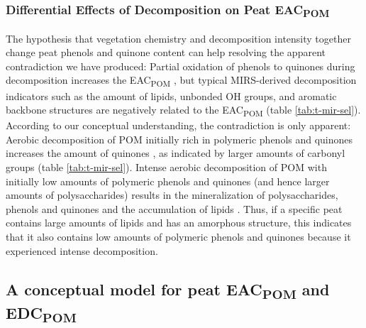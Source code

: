 \documentclass[alpha-refs, lineno]{wiley-article-rmd}
\begin{document}
\hypertarget{differential-effects-of-decomposition-on-peat-eac}{%
\subsubsection{\texorpdfstring{Differential Effects of Decomposition on Peat EAC\textsubscript{POM}}{Differential Effects of Decomposition on Peat EAC}}\label{differential-effects-of-decomposition-on-peat-eac}}

The hypothesis that vegetation chemistry and decomposition intensity together change peat phenols and quinone content can help resolving the apparent contradiction we have produced: Partial oxidation of phenols to quinones during decomposition increases the EAC\textsubscript{POM} \autocite{Aeschbacher.2012,Walpen.2018,Tan.2017}, but typical MIRS-derived decomposition indicators such as the amount of lipids, unbonded OH groups, and aromatic backbone structures \autocite{Cocozza.2003,Artz.2008} are negatively related to the EAC\textsubscript{POM} (table \ref{tab:t-mir-sel}). According to our conceptual understanding, the contradiction is only apparent: Aerobic decomposition of POM initially rich in polymeric phenols and quinones increases the amount of quinones \autocite{Aeschbacher.2012}, as indicated by larger amounts of carbonyl groups (table \ref{tab:t-mir-sel}). Intense aerobic decomposition of POM with initially low amounts of polymeric phenols and quinones (and hence larger amounts of polysaccharides) results in the mineralization of polysaccharides, phenols and quinones and the accumulation of lipids \autocite{Fenner.2011,Leifeld.2012}. Thus, if a specific peat contains large amounts of lipids and has an amorphous structure, this indicates that it also contains low amounts of polymeric phenols and quinones because it experienced intense decomposition.

\hypertarget{a-conceptual-model-for-peat-eac-and-edc}{%
\subsection{\texorpdfstring{A conceptual model for peat EAC\textsubscript{POM} and EDC\textsubscript{POM}}{A conceptual model for peat EAC and EDC}}\label{a-conceptual-model-for-peat-eac-and-edc}}
\end{document}
